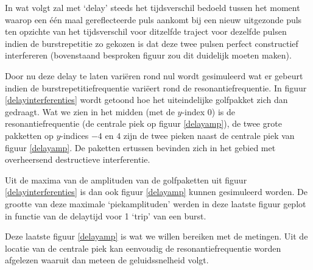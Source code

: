
In wat volgt zal met `delay' steeds het tijdsverschil bedoeld tussen het 
moment waarop een \'e\'en maal gereflecteerde puls aankomt bij een nieuw 
uitgezonde puls ten opzichte van het tijdsverschil voor ditzelfde traject 
voor dezelfde pulsen indien de burstrepetitie zo gekozen is dat deze twee 
pulsen perfect constructief interfereren (bovenstaand besproken figuur zou 
dit duidelijk moeten maken).

Door nu deze delay te laten vari\"eren rond nul wordt gesimuleerd wat er 
gebeurt indien de burstrepetitiefrequentie vari\"eert rond de 
resonantiefrequentie. In figuur \ref{delayinterferenties} wordt getoond hoe 
het uiteindelijke golfpakket zich dan gedraagt. Wat we zien in het midden 
(met de $y$-index 0) is de resonantiefrequentie (de centrale piek op figuur 
\ref{delayamp}), de twee grote pakketten op $y$-indices $-4$ en $4$ zijn de 
twee pieken naast de centrale piek van figuur \ref{delayamp}. De paketten 
ertussen bevinden zich in het gebied met overheersend destructieve 
interferentie.


Uit de maxima van de amplituden van de golfpaketten uit figuur 
\ref{delayinterferenties} is dan ook figuur \ref{delayamp} kunnen 
gesimuleerd worden. De grootte van deze maximale `piekamplituden' werden in 
deze laatste figuur geplot in functie van de delaytijd voor 1 `trip' van 
een burst.

Deze laatste figuur \ref{delayamp} is wat we willen bereiken met de 
metingen. Uit de locatie van de centrale piek kan eenvoudig de 
resonantiefrequentie worden afgelezen waaruit dan meteen de geluidssnelheid 
volgt.


